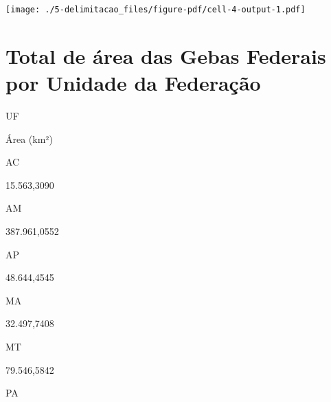 \documentclass[
  letterpaper,
]{report}
\begin{document}
\texttt{[image: ./5-delimitacao\_files/figure-pdf/cell-4-output-1.pdf]}

\hypertarget{total-de-uxe1rea-das-gebas-federais-por-unidade-da-federauxe7uxe3o}{%
\section{Total de área das Gebas Federais por Unidade da
Federação}\label{total-de-uxe1rea-das-gebas-federais-por-unidade-da-federauxe7uxe3o}}

\n  

\n    

\n      

UF

\n      

Área (km²)

\n    

\n  

\n  

\n    

\n      

AC

\n      

15.563,3090

\n    

\n    

\n      

AM

\n      

387.961,0552

\n    

\n    

\n      

AP

\n      

48.644,4545

\n    

\n    

\n      

MA

\n      

32.497,7408

\n    

\n    

\n      

MT

\n      

79.546,5842

\n    

\n    

\n      

PA

\n      
\end{document}
